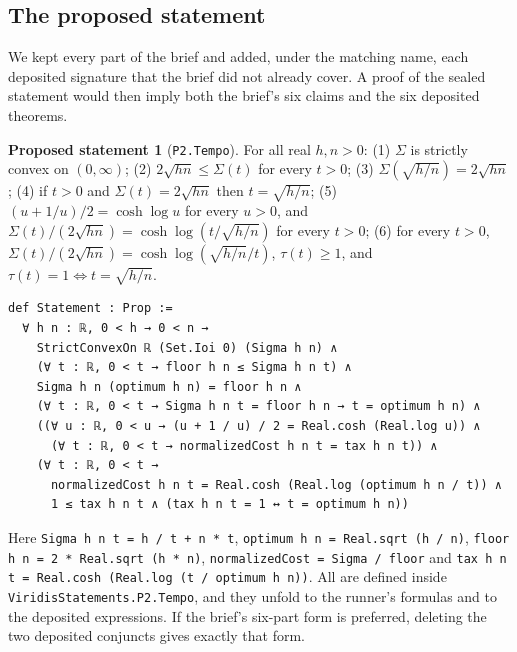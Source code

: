 \documentclass[11pt]{article}
\theoremstyle{definition}
\newtheorem{proposal}[theorem]{Proposed statement}
\theoremstyle{remark}
\begin{document}
\subsection{The proposed statement}
We kept every part of the brief and added, under the matching name, each deposited signature that the brief did not already cover.
A proof of the sealed statement would then imply both the brief's six claims and the six deposited theorems.
\begin{proposal}[\texttt{P2.Tempo}]
For all real $h,n>0$:
(1) $\Sigma$ is strictly convex on $(0,\infty)$;
(2) $2\sqrt{hn}\le\Sigma(t)$ for every $t>0$;
(3) $\Sigma(\sqrt{h/n})=2\sqrt{hn}$;
(4) if $t>0$ and $\Sigma(t)=2\sqrt{hn}$ then $t=\sqrt{h/n}$;
(5) $(u+1/u)/2=\cosh\log u$ for every $u>0$, and $\Sigma(t)/(2\sqrt{hn})=\cosh\log(t/\sqrt{h/n})$ for every $t>0$;
(6) for every $t>0$, $\Sigma(t)/(2\sqrt{hn})=\cosh\log(\sqrt{h/n}/t)$, $\tau(t)\ge1$, and $\tau(t)=1\iff t=\sqrt{h/n}$.
\end{proposal}
\begin{lstlisting}
def Statement : Prop :=
  ∀ h n : ℝ, 0 < h → 0 < n →
    StrictConvexOn ℝ (Set.Ioi 0) (Sigma h n) ∧
    (∀ t : ℝ, 0 < t → floor h n ≤ Sigma h n t) ∧
    Sigma h n (optimum h n) = floor h n ∧
    (∀ t : ℝ, 0 < t → Sigma h n t = floor h n → t = optimum h n) ∧
    ((∀ u : ℝ, 0 < u → (u + 1 / u) / 2 = Real.cosh (Real.log u)) ∧
      (∀ t : ℝ, 0 < t → normalizedCost h n t = tax h n t)) ∧
    (∀ t : ℝ, 0 < t →
      normalizedCost h n t = Real.cosh (Real.log (optimum h n / t)) ∧
      1 ≤ tax h n t ∧ (tax h n t = 1 ↔ t = optimum h n))
\end{lstlisting}
Here \texttt{Sigma h n t = h / t + n * t}, \texttt{optimum h n = Real.sqrt (h / n)}, \texttt{floor h n = 2 * Real.sqrt (h * n)},
\texttt{normalizedCost = Sigma / floor} and \texttt{tax h n t = Real.cosh (Real.log (t / optimum h n))}.
All are defined inside \texttt{ViridisStatements.P2.Tempo}, and they unfold to the runner's formulas and to the deposited expressions.
If the brief's six-part form is preferred, deleting the two deposited conjuncts gives exactly that form.
\end{document}
